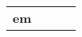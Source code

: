 \documentclass[twocolumn]{article}
\begin{document}
\begin{tabular}{ | >{\bfseries}m{0.5em} | >{\bfseries}m{1em} | m{12em} | m{8em} |}
em}{- \newline  \newline  \newline  \newline  \newline - \newline  \newline  \newline  \newline  \newline - \newline  \newline  \newline  \newline  \newline - \newline  \newline  \newline  \newline  \newline - \newline  \newline  \newline  \newline  \newline - \newline  \newline  \newline  \newline  \newline - \newline  \newline  \newline  \newline  \newline - \newline  \newline  \newline  
\end{tabular}
\end{document}
